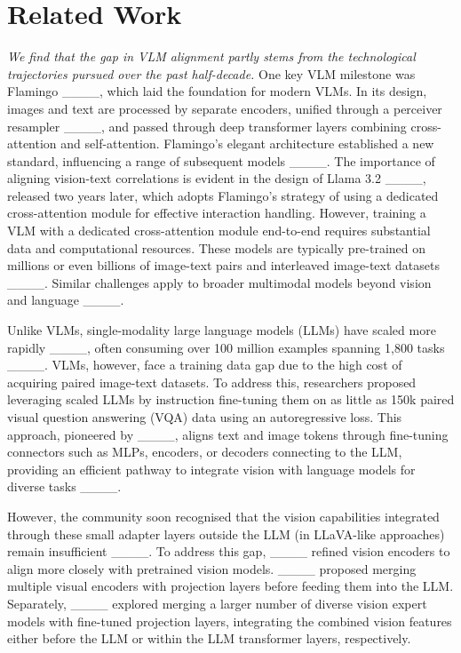 \section{Related Work}
\label{sec:related_work}

\emph{We find that the gap in VLM alignment partly stems from the technological trajectories pursued over the past half-decade.}  
One key VLM milestone was Flamingo ____, which laid the foundation for modern VLMs. In its design, images and text are processed by separate encoders, unified through a perceiver resampler ____, and passed through deep transformer layers combining cross-attention and self-attention. Flamingo's elegant architecture established a new standard, influencing a range of subsequent models ____.  
%
The importance of aligning vision-text correlations is evident in the design of Llama 3.2 ____, released two years later, which adopts Flamingo’s strategy of using a dedicated cross-attention module for effective interaction handling. However, training a VLM with a dedicated cross-attention module end-to-end requires substantial data and computational resources. These models are typically pre-trained on millions or even billions of image-text pairs and interleaved image-text datasets ____. 
Similar challenges apply to broader multimodal models beyond vision and language ____.

Unlike VLMs, single-modality large language models (LLMs) have scaled more rapidly ____, often consuming over 100 million examples spanning 1,800 tasks ____. VLMs, however, face a training data gap due to the high cost of acquiring paired image-text datasets.  
%
To address this, researchers proposed leveraging scaled LLMs by instruction fine-tuning them on as little as 150k paired visual question answering (VQA) data using an autoregressive loss. This approach, pioneered by ____, aligns text and image tokens through fine-tuning connectors such as MLPs, encoders, or decoders connecting to the LLM, providing an efficient pathway to integrate vision with language models for diverse tasks ____.

However, the community soon recognised that the vision capabilities integrated through these small adapter layers outside the LLM (in LLaVA-like approaches) remain insufficient ____. To address this gap, ____ refined vision encoders to align more closely with pretrained vision models.  
____ proposed merging multiple visual encoders with projection layers before feeding them into the LLM.  
Separately, ____ explored merging a larger number of diverse vision expert models with fine-tuned projection layers, integrating the combined vision features either before the LLM or within the LLM transformer layers, respectively.  

